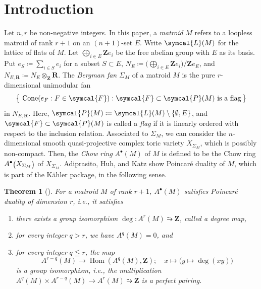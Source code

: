 \documentclass[a4paper,final,oneside]{amsart}
\theoremstyle{definition}
\theoremstyle{plain}
\newtheorem{theorem}[definition]{Theorem}
\theoremstyle{remark}
\DeclareMathOperator{\Hom}{Hom}
\DeclareMathOperator{\Cone}{Cone}
\begin{document}
\section{Introduction}
Let \(n, r\) be non-negative integers.
In this paper, a \emph{matroid} \(M\) refers to a loopless matroid of rank \(r+1\) on an \((n+1)\)-set \(E\).
Write \(\symcal{L}(M)\) for the lattice of flats of \(M\).
Let \(\bigoplus_{i \in E}\symbf{Z}e_i\) be the free abelian group with \(E\) as its basis.
Put \(e_S \coloneq\sum_{i \in S}e_i\) for a subset \(S\subset E\), \(N_E\coloneq \bigl(\bigoplus_{i\in E}\symbf{Z}e_i\bigr)/\symbf{Z}e_E\), and \(N_{E,\symbf{R}}\coloneq N_E\otimes_{\symbf{Z}}\symbf{R}\).
The \emph{Bergman fan} \(\Sigma_M\) of a matroid \(M\) is the pure \(r\)-dimensional unimodular fan 
\begin{equation}
\big\{\,\Cone (e_F:F \in\symcal{F}) : \text{\(\symcal{F}\subset \symcal{P}(M)\) is a flag}\,\big\}
\end{equation}
in \(N_{E,\symbf{R}}\).
Here, \(\symcal{P}(M)\coloneq \symcal{L}(M)\setminus \{\emptyset,E\}\), and \(\symcal{F} \subset \symcal{P}(M)\) is called a \emph{flag} if it is linearly ordered with respect to the inclusion relation.
Associated to \(\Sigma_M\), we can consider the \(n\)-dimensional smooth quasi-projective complex toric variety \(X_{\Sigma_M}\), which is possibly non-compact.
Then, the \emph{Chow ring} \(A^{\bullet}(M)\) of \(M\) is defined to be the Chow ring \(A^{\bullet}\raisebox{-.25ex}{\big(}X_{\Sigma_M}\raisebox{-.25ex}{\big)}\) of \(X_{\Sigma_M}\).
Adiprasito, Huh, and Katz show Poincar\'e duality of \(M\), which is part of the K\"ahler package, in the following sense.
\begin{theorem}[{\cite[Theorem 6.19]{AHK_18}}]\label{thm_2}
For a matroid \(M\) of rank \(r+1\), \(A^{\bullet}(M)\) satisfies Poincar\'e duality of dimension \(r\), i.e., it satisfies
\begin{enumerate}[label=$\arabic*)$]
\item there exists a group isomorphism \(\deg\colon A^r(M)\similarrightarrow \symbf{Z}\), called a \emph{degree map},
\item for every integer \(q > r\), we have \(A^q(M) = 0\), and 
\item for every integer \(q \leqq r\), the map
\begin{equation}
A^{r-q}(M) \to \Hom(A^q(M),\symbf{Z});\quad x \mapsto \big(y \mapsto\deg(xy)\big)
\end{equation}
is a group isomorphism, i.e., the multiplication \(A^q(M)\times A^{r-q}(M) \to A^r(M)\similarrightarrow \symbf{Z}\) is a perfect pairing.
\end{enumerate}
\end{theorem}
\end{document}

